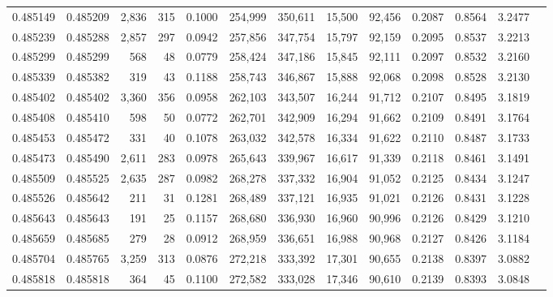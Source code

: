 \begin{tabular}{rrrrrrrrrrrrr}
0.485149 & 0.485209 & 2,836 &   315 &                                     0.1000 & 254,999 & 350,611 &  15,500 &  92,456 & 0.2087 & 0.8564 & 3.2477 \\
0.485239 & 0.485288 & 2,857 &   297 &                                     0.0942 & 257,856 & 347,754 &  15,797 &  92,159 & 0.2095 & 0.8537 & 3.2213 \\
0.485299 & 0.485299 &   568 &    48 &                                     0.0779 & 258,424 & 347,186 &  15,845 &  92,111 & 0.2097 & 0.8532 & 3.2160 \\
0.485339 & 0.485382 &   319 &    43 &                                     0.1188 & 258,743 & 346,867 &  15,888 &  92,068 & 0.2098 & 0.8528 & 3.2130 \\
0.485402 & 0.485402 & 3,360 &   356 &                                     0.0958 & 262,103 & 343,507 &  16,244 &  91,712 & 0.2107 & 0.8495 & 3.1819 \\
0.485408 & 0.485410 &   598 &    50 &                                     0.0772 & 262,701 & 342,909 &  16,294 &  91,662 & 0.2109 & 0.8491 & 3.1764 \\
0.485453 & 0.485472 &   331 &    40 &                                     0.1078 & 263,032 & 342,578 &  16,334 &  91,622 & 0.2110 & 0.8487 & 3.1733 \\
0.485473 & 0.485490 & 2,611 &   283 &                                     0.0978 & 265,643 & 339,967 &  16,617 &  91,339 & 0.2118 & 0.8461 & 3.1491 \\
0.485509 & 0.485525 & 2,635 &   287 &                                     0.0982 & 268,278 & 337,332 &  16,904 &  91,052 & 0.2125 & 0.8434 & 3.1247 \\
0.485526 & 0.485642 &   211 &    31 &                                     0.1281 & 268,489 & 337,121 &  16,935 &  91,021 & 0.2126 & 0.8431 & 3.1228 \\
0.485643 & 0.485643 &   191 &    25 &                                     0.1157 & 268,680 & 336,930 &  16,960 &  90,996 & 0.2126 & 0.8429 & 3.1210 \\
0.485659 & 0.485685 &   279 &    28 &                                     0.0912 & 268,959 & 336,651 &  16,988 &  90,968 & 0.2127 & 0.8426 & 3.1184 \\
0.485704 & 0.485765 & 3,259 &   313 &                                     0.0876 & 272,218 & 333,392 &  17,301 &  90,655 & 0.2138 & 0.8397 & 3.0882 \\
0.485818 & 0.485818 &   364 &    45 &                                     0.1100 & 272,582 & 333,028 &  17,346 &  90,610 & 0.2139 & 0.8393 & 3.0848 \\

\end{tabular}
